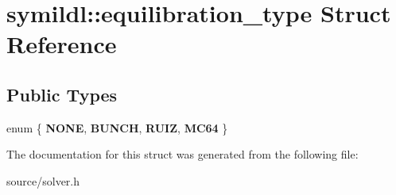 \hypertarget{structsymildl_1_1equilibration__type}{}\section{symildl\+:\+:equilibration\+\_\+type Struct Reference}
\label{structsymildl_1_1equilibration__type}
\subsection*{Public Types}
\begin{DoxyCompactItemize}
\item 
enum \{ {\bfseries N\+O\+NE}, 
{\bfseries B\+U\+N\+CH}, 
{\bfseries R\+U\+IZ}, 
{\bfseries M\+C64}
 \}\hypertarget{structsymildl_1_1equilibration__type_ab010e95fc085b7e5d53fa0a78ac40cb9}{}\label{structsymildl_1_1equilibration__type_ab010e95fc085b7e5d53fa0a78ac40cb9}

\end{DoxyCompactItemize}


The documentation for this struct was generated from the following file\+:\begin{DoxyCompactItemize}
\item 
source/solver.\+h\end{DoxyCompactItemize}

